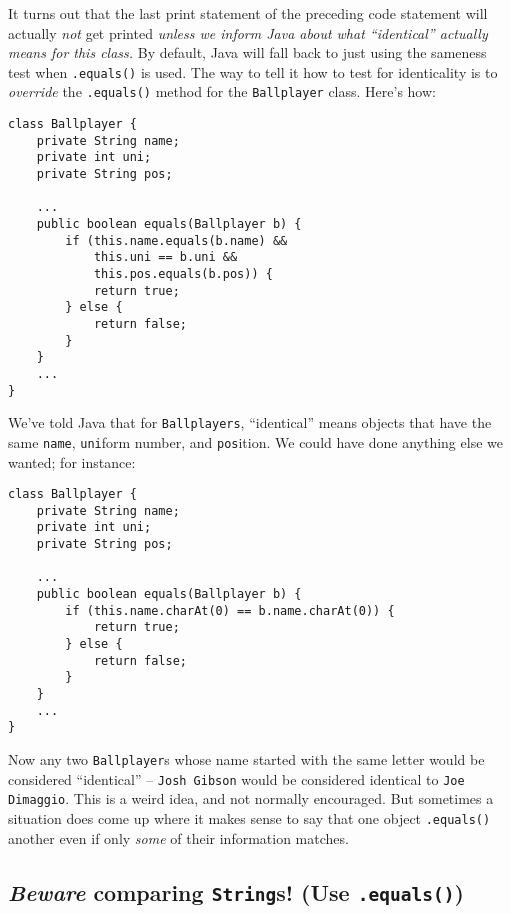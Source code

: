 It turns out that the last print statement of the preceding code statement
will actually \textit{not} get printed \textit{unless we inform Java about
what ``identical'' actually means for this class.} By default, Java will fall
back to just using the sameness test when \texttt{.equals()} is used. The way
to tell it how to test for identicality is to \textit{override} the
\texttt{.equals()} method for the \texttt{Ballplayer} class. Here's how:

\begin{Verbatim}[fontsize=\footnotesize,samepage=true,frame=single]
class Ballplayer {
    private String name;
    private int uni;
    private String pos;
    
    ...
    public boolean equals(Ballplayer b) {
        if (this.name.equals(b.name) &&
            this.uni == b.uni &&
            this.pos.equals(b.pos)) {
            return true;
        } else {
            return false;
        }
    }
    ...
}
\end{Verbatim}

We've told Java that for \texttt{Ballplayers}, ``identical'' means objects that
have the same \texttt{name}, \texttt{uni}form number, and \texttt{pos}ition.
We could have done anything else we wanted; for instance:

\begin{Verbatim}[fontsize=\footnotesize,samepage=true,frame=single]
class Ballplayer {
    private String name;
    private int uni;
    private String pos;
    
    ...
    public boolean equals(Ballplayer b) {
        if (this.name.charAt(0) == b.name.charAt(0)) {
            return true;
        } else {
            return false;
        }
    }
    ...
}
\end{Verbatim}

Now any two \texttt{Ballplayer}s whose name started with the same letter would
be considered ``identical'' -- \texttt{Josh Gibson} would be considered
identical to \texttt{Joe Dimaggio}. This is a weird idea, and not normally
encouraged. But sometimes a situation does come up where it makes sense to say
that one object \texttt{.equals()} another even if only \textit{some} of their
information matches.

\subsection{\textit{Beware} comparing \texttt{String}s! (Use \texttt{.equals()})}

